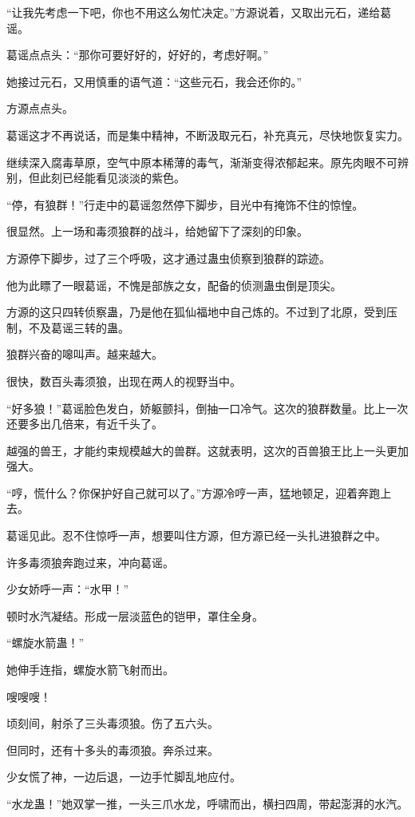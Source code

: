 \begin{this_body}
“让我先考虑一下吧，你也不用这么匆忙决定。”方源说着，又取出元石，递给葛谣。

葛谣点点头：“那你可要好好的，好好的，考虑好啊。”

她接过元石，又用慎重的语气道：“这些元石，我会还你的。”

方源点点头。

葛谣这才不再说话，而是集中精神，不断汲取元石，补充真元，尽快地恢复实力。

继续深入腐毒草原，空气中原本稀薄的毒气，渐渐变得浓郁起来。原先肉眼不可辨别，但此刻已经能看见淡淡的紫色。

“停，有狼群！”行走中的葛谣忽然停下脚步，目光中有掩饰不住的惊惶。

很显然。上一场和毒须狼群的战斗，给她留下了深刻的印象。

方源停下脚步，过了三个呼吸，这才通过蛊虫侦察到狼群的踪迹。

他为此瞟了一眼葛谣，不愧是部族之女，配备的侦测蛊虫倒是顶尖。

方源的这只四转侦察蛊，乃是他在狐仙福地中自己炼的。不过到了北原，受到压制，不及葛谣三转的蛊。

狼群兴奋的嗥叫声。越来越大。

很快，数百头毒须狼，出现在两人的视野当中。

“好多狼！”葛谣脸色发白，娇躯颤抖，倒抽一口冷气。这次的狼群数量。比上一次还要多出几倍来，有近千头了。

越强的兽王，才能约束规模越大的兽群。这就表明，这次的百兽狼王比上一头更加强大。

“哼，慌什么？你保护好自己就可以了。”方源冷哼一声，猛地顿足，迎着奔跑上去。

葛谣见此。忍不住惊呼一声，想要叫住方源，但方源已经一头扎进狼群之中。

许多毒须狼奔跑过来，冲向葛谣。

少女娇呼一声：“水甲！”

顿时水汽凝结。形成一层淡蓝色的铠甲，罩住全身。

“螺旋水箭蛊！”

她伸手连指，螺旋水箭飞射而出。

嗖嗖嗖！

顷刻间，射杀了三头毒须狼。伤了五六头。

但同时，还有十多头的毒须狼。奔杀过来。

少女慌了神，一边后退，一边手忙脚乱地应付。

“水龙蛊！”她双掌一推，一头三爪水龙，呼啸而出，横扫四周，带起澎湃的水汽。


\end{this_body}
